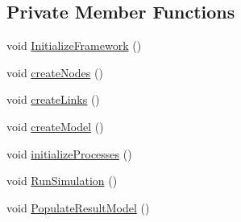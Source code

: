 \subsection*{Private Member Functions}
\begin{DoxyCompactItemize}
\item 
void \hyperlink{classNetTrafficSimulator_1_1SimulationController_aee0204844a793fc1e26e1940f8c3f1e3}{Initialize\-Framework} ()
\item 
void \hyperlink{classNetTrafficSimulator_1_1SimulationController_aaa2dfff1b6c614ec8202cac5f0aea58c}{create\-Nodes} ()
\item 
void \hyperlink{classNetTrafficSimulator_1_1SimulationController_a65bdc4b66235a69672fda176b1937bc7}{create\-Links} ()
\item 
void \hyperlink{classNetTrafficSimulator_1_1SimulationController_ad23685dbec3fce89fc4fa615edef1150}{create\-Model} ()
\item 
void \hyperlink{classNetTrafficSimulator_1_1SimulationController_a893854760ab4e24a432ab72aa1f20d1a}{initialize\-Processes} ()
\item 
void \hyperlink{classNetTrafficSimulator_1_1SimulationController_ac72e9edb9b5ab11d579be22ee0029294}{Run\-Simulation} ()
\item 
void \hyperlink{classNetTrafficSimulator_1_1SimulationController_ae40f65ccc6e418355c89294d3dddca5a}{Populate\-Result\-Model} ()
\end{DoxyCompactItemize}
